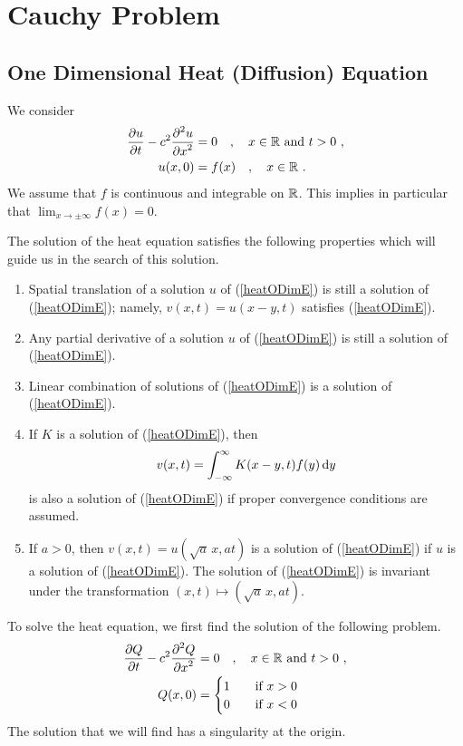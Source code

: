 \section{Cauchy Problem}  \label{SectHeatEqCauchyPr}

\subsection{One Dimensional Heat (Diffusion) Equation}

We consider
\begin{align}
\frac{\partial{u}}{\partial t} - c^2 \frac{\displaystyle \partial^{2}{u}} {\displaystyle \partial x^{2}} &= 0 \quad , \quad x\in \mathbb{R}
\ \text{and} \ t > 0 \ , \label{heatODimE} \\
u(x,0) &= f(x) \quad , \quad x \in \mathbb{R} \ . \label{heatODimIC}
\end{align}
We assume that $f$ is continuous and integrable on $\mathbb{R}$.  This
implies in particular that $\displaystyle \lim_{x\to \pm \infty} f(x) = 0$.

The solution of the heat equation satisfies the following properties
which will guide us in the search of this solution.

\begin{enumerate}
\item Spatial translation of a solution $u$ of (\ref{heatODimE})
is still a solution of (\ref{heatODimE}); namely, $v(x,t) = u(x-y,t)$
satisfies (\ref{heatODimE}).
\item Any partial derivative of a solution $u$ of (\ref{heatODimE})
is still a solution of (\ref{heatODimE}).
\item Linear combination of solutions of (\ref{heatODimE}) is a
solution of (\ref{heatODimE}).
\item If $K$ is a solution of (\ref{heatODimE}), then
\[
v(x,t) = \int_{-\infty}^\infty K(x-y,t) f(y) \,\mathrm{d}{y}
\]
is also a solution of (\ref{heatODimE}) if proper convergence
conditions are assumed.
\item If $a>0$, then $v(x,t) = u(\sqrt{a}\,x, at)$ is a solution of
(\ref{heatODimE}) if $u$ is a solution of (\ref{heatODimE}).  The
solution of (\ref{heatODimE}) is invariant under the transformation
$(x,t) \mapsto (\sqrt{a}\,x, at)$.
\end{enumerate}

To solve the heat equation, we first find the solution of the
following problem.
\begin{align}
\frac{\partial{Q}}{\partial t} - c^2 \frac{\displaystyle \partial^{2}{Q}} {\displaystyle \partial x^{2}} &= 0 \quad , \quad x\in \mathbb{R}
\ \text{and} \ t>0 \ , \label{heatODimQE} \\
Q(x,0) &= \begin{cases}
1 & \quad \text{if} \ x > 0 \\
0 & \quad \text{if} \ x < 0
\end{cases} \label{heatODimQC}
\end{align}
The solution that we will find has a singularity at the origin.

